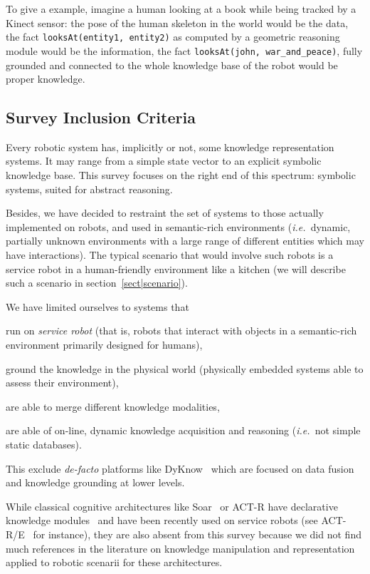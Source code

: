 \documentclass[a4paper, twocolumn]{article}
\newcommand{\ie}{{\textit{i.e.\ }}}
\newcommand{\concept}[1]{{\footnotesize \texttt{#1}}}
\begin{document}
To give a example, imagine a human looking at a book while being tracked by a
Kinect sensor: the pose of the human skeleton in the world would be the data,
the fact \concept{looksAt(entity1, entity2)} as computed by a geometric reasoning
module would be the information, the fact \concept{looksAt(john,
war\_and\_peace)}, fully grounded and connected to the whole knowledge base of
the robot would be proper knowledge.

\subsection*{Survey Inclusion Criteria}
\label{sect|inclusion-criteria}

Every robotic system has, implicitly or not, some knowledge representation
systems. It may range from a simple state vector to an explicit symbolic
knowledge base.  This survey focuses on the right end of this spectrum:
symbolic systems, suited for abstract reasoning.

Besides, we have decided to restraint the set of systems to those actually
implemented on robots, and used in semantic-rich environments (\ie dynamic,
partially unknown environments with a large range of different entities which
may have interactions). The typical scenario that would involve such robots is
a service robot in a human-friendly environment like a kitchen (we will
describe such a scenario in section~\ref{sect|scenario}).

We have limited ourselves to systems that
\begin{inparaenum} 
    \item  run on \emph{service robot} (that is, robots that interact with 
    objects in a semantic-rich environment primarily designed for humans),
    \item  ground the knowledge in the physical world (physically embedded
    systems able to assess their environment),
    \item  are able to merge different knowledge modalities,
    \item  are able of on-line, dynamic knowledge acquisition and reasoning 
    (\ie not simple static databases).
\end{inparaenum}

This exclude \textit{de-facto} platforms like {\sc DyKnow}~\cite{Heintz2004}
which are focused on data fusion and knowledge grounding at lower levels.

While classical cognitive architectures like {\sc Soar}~\cite{Lehman2006} or
{\sc ACT-R} have declarative knowledge modules~\cite{Derbinsky2010} and have
been recently used on service robots (see {\sc ACT-R/E}~\cite{Kennedy2009} for
instance), they are also absent from this survey because we did not find much
references in the literature on knowledge manipulation and representation
applied to robotic scenarii for these architectures.
\end{document}
